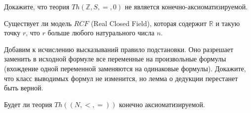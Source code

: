 \setcounter{curtask}{41}



\begin{task}
    Докажите, что теория $Th(\mathbb{Z}, S, =, 0)$ не является
    конечно-аксиоматизируемой.
\end{task}

\begin{task}
  	Существует ли модель $RCF$ (Real Closed Field), которая содержит $\mathbb{R}$ и
    такую точку $r$, что $r$ больше любого натурального числа $n$.
\end{task}

\breakline



\begin{ptask}{20}
    Добавим к исчислению высказываний правило подстановки. Оно разрешает заменить в
    исходной формуле все переменные на произвольные формулы (вхождение одной
    переменной заменяются на одинаковые формулы). Докажите, что класс выводимых
    формул не изменится, но лемма о дедукции перестанет быть верной. 
\end{ptask}

\begin{ptask}{40}
    Будет ли теория $Th((N, <, =))$ конечно аксиоматизируемой.
\end{ptask}
